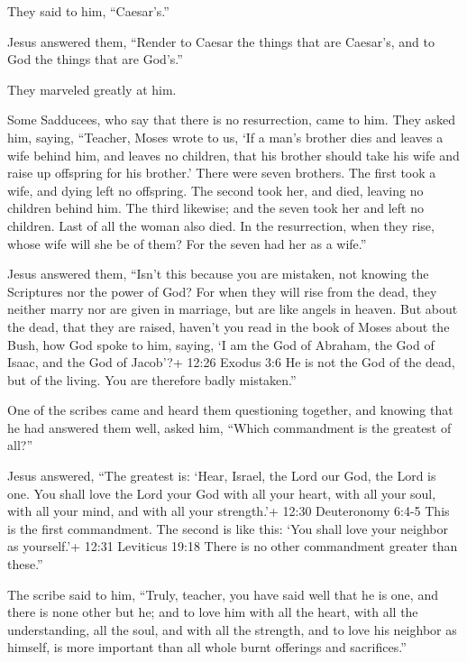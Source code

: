 They said to him, ``Caesar's.''

 Jesus answered them, ``Render to Caesar the things that
are Caesar's, and to God the things that are God's.''

They marveled greatly at him.

 Some Sadducees, who say that there is no resurrection,
came to him. They asked him, saying,  ``Teacher, Moses
wrote to us, `If a man's brother dies and leaves a wife behind him, and
leaves no children, that his brother should take his wife and raise up
offspring for his brother.'  There were seven brothers. The
first took a wife, and dying left no offspring.  The second
took her, and died, leaving no children behind him. The third likewise;
 and the seven took her and left no children. Last of all
the woman also died.  In the resurrection, when they rise,
whose wife will she be of them? For the seven had her as a wife.''

 Jesus answered them, ``Isn't this because you are
mistaken, not knowing the Scriptures nor the power of God? 
For when they will rise from the dead, they neither marry nor are given
in marriage, but are like angels in heaven.  But about the
dead, that they are raised, haven't you read in the book of Moses about
the Bush, how God spoke to him, saying, `I am the God of Abraham, the
God of Isaac, and the God of Jacob'?+ 12:26 Exodus 3:6  He
is not the God of the dead, but of the living. You are therefore badly
mistaken.''

 One of the scribes came and heard them questioning
together, and knowing that he had answered them well, asked him, ``Which
commandment is the greatest of all?''

 Jesus answered, ``The greatest is: `Hear, Israel, the Lord
our God, the Lord is one.  You shall love the Lord your God
with all your heart, with all your soul, with all your mind, and with
all your strength.'+ 12:30 Deuteronomy 6:4-5 This is the first
commandment.  The second is like this: `You shall love your
neighbor as yourself.'+ 12:31 Leviticus 19:18 There is no other
commandment greater than these.''

 The scribe said to him, ``Truly, teacher, you have said
well that he is one, and there is none other but he;  and
to love him with all the heart, with all the understanding, all the
soul, and with all the strength, and to love his neighbor as himself, is
more important than all whole burnt offerings and sacrifices.''

